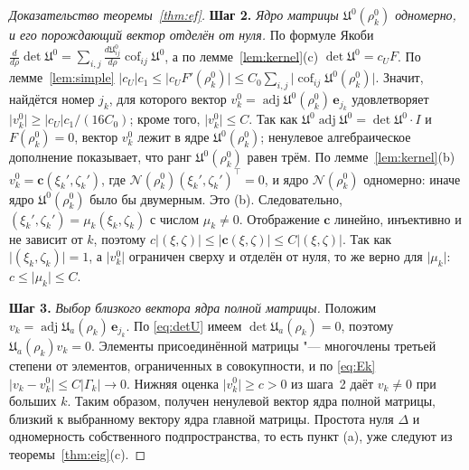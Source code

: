 \documentclass[12pt,a4paper]{article}
\numberwithin{equation}{section}
\theoremstyle{definition}
\newcommand{\step}[1]{\smallskip\noindent\textbf{Шаг #1.}}
\newcommand{\abs}[1]{\lvert#1\rvert}
\newcommand{\Uf}{\mathfrak U}
\newcommand{\Mm}{\mathcal N}
\begin{document}
\begin{proof}[Доказательство теоремы~\ref{thm:ef}]
\step{2} \textit{Ядро матрицы $\Uf^0(\rho_k^0)$ одномерно, и его порождающий вектор
отделён от нуля.} По формуле Якоби
$\frac{d}{d\rho}\det\Uf^0=\sum_{i,j}\frac{d\Uf^0_{ij}}{d\rho}\operatorname{cof}_{ij}\Uf^0$, а по
лемме~\ref{lem:kernel}(c) $\det\Uf^0=c_UF$. По лемме~\ref{lem:simple}
$\abs{c_U}c_1\le\abs{c_UF'(\rho_k^0)}\le C_0\sum_{i,j}\abs{\operatorname{cof}_{ij}\Uf^0(\rho_k^0)}$.
Значит, найдётся номер $j_k$, для которого вектор
$v_k^0=\operatorname{adj}\Uf^0(\rho_k^0)\,\mathbf e_{j_k}$ удовлетворяет
$\abs{v_k^0}\ge\abs{c_U}c_1/(16C_0)$; кроме того, $\abs{v_k^0}\le C$. Так как
$\Uf^0\operatorname{adj}\Uf^0=\det\Uf^0\cdot I$ и $F(\rho_k^0)=0$, вектор $v_k^0$ лежит в ядре
$\Uf^0(\rho_k^0)$; ненулевое алгебраическое дополнение показывает, что ранг $\Uf^0(\rho_k^0)$ равен
трём. По лемме~\ref{lem:kernel}(b) $v_k^0=\mathbf c(\xi_k',\zeta_k')$, где
$\Mm(\rho_k^0)(\xi_k',\zeta_k')^\top=0$, и ядро $\Mm(\rho_k^0)$ одномерно: иначе ядро
$\Uf^0(\rho_k^0)$ было бы двумерным. Это (b). Следовательно,
$(\xi_k',\zeta_k')=\mu_k(\xi_k,\zeta_k)$ с числом $\mu_k\ne0$. Отображение $\mathbf c$ линейно,
инъективно и не зависит от $k$, поэтому
$c\abs{(\xi,\zeta)}\le\abs{\mathbf c(\xi,\zeta)}\le C\abs{(\xi,\zeta)}$. Так как
$\abs{(\xi_k,\zeta_k)}=1$, а $\abs{v_k^0}$ ограничен сверху и отделён от нуля, то же верно для
$\abs{\mu_k}$: $c\le\abs{\mu_k}\le C$.

\step{3} \textit{Выбор близкого вектора ядра полной матрицы.}
Положим $v_k=\operatorname{adj}\Uf_a(\rho_k)\,\mathbf e_{j_k}$.
По \eqref{eq:detU} имеем $\det\Uf_a(\rho_k)=0$, поэтому $\Uf_a(\rho_k)v_k=0$.
Элементы присоединённой матрицы "--- многочлены третьей степени от элементов,
ограниченных в совокупности, и по \eqref{eq:Ek}
$\abs{v_k-v_k^0}\le C\abs{\Gamma_k}\to0$.
Нижняя оценка $\abs{v_k^0}\ge c>0$ из шага~2 даёт $v_k\ne0$ при больших $k$.
Таким образом, получен ненулевой вектор ядра полной матрицы, близкий к
выбранному вектору ядра главной матрицы. Простота нуля $\Delta$ и одномерность
собственного подпространства, то есть пункт (a), уже следуют из
теоремы~\ref{thm:eig}(c).


\end{proof}
\end{document}
